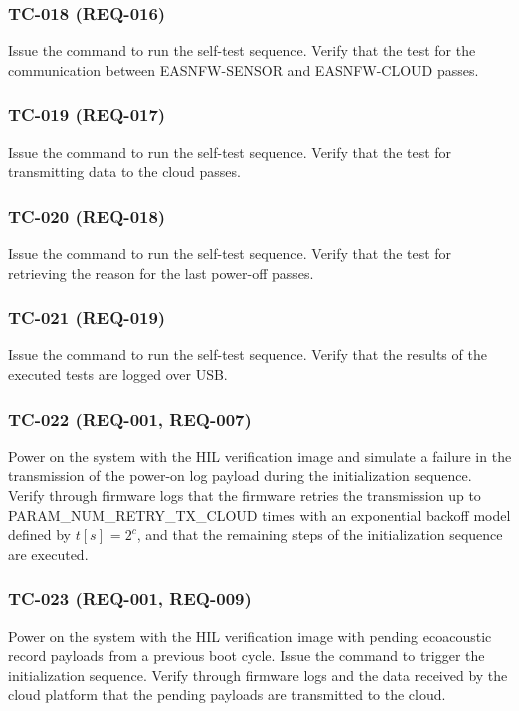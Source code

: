 \documentclass[11pt,a4paper]{article}
\begin{document}
\subsubsection{TC-018 (REQ-016)}

Issue the command to run the self-test sequence. Verify that the test for the
communication between EASNFW-SENSOR and EASNFW-CLOUD passes.

\subsubsection{TC-019 (REQ-017)}

Issue the command to run the self-test sequence. Verify that the test for
transmitting data to the cloud passes.

\subsubsection{TC-020 (REQ-018)}

Issue the command to run the self-test sequence. Verify that the test for
retrieving the reason for the last power-off passes.

\subsubsection{TC-021 (REQ-019)}

Issue the command to run the self-test sequence. Verify that the results of
the executed tests are logged over USB.

\subsubsection{TC-022 (REQ-001, REQ-007)}

Power on the system with the HIL verification image and simulate a failure in
the transmission of the power-on log payload during the initialization sequence.
Verify through firmware logs that the firmware retries the transmission up to
PARAM\_NUM\_RETRY\_TX\_CLOUD times with an exponential backoff model defined by
$t[s]=2^c$, and that the remaining steps of the initialization sequence are
executed.

\subsubsection{TC-023 (REQ-001, REQ-009)}

Power on the system with the HIL verification image with pending ecoacoustic
record payloads from a previous boot cycle. Issue the command to trigger the
initialization sequence. Verify through firmware logs and the data received by
the cloud platform that the pending payloads are transmitted to the cloud.
\end{document}
